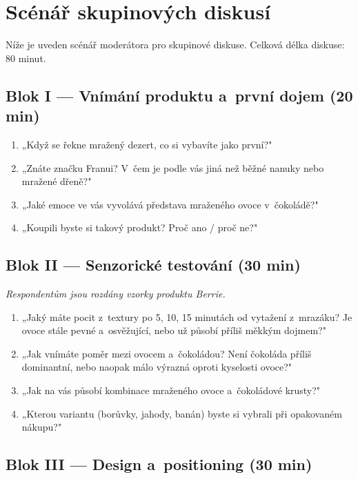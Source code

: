 \chapter{Scénář skupinových diskusí}
\label{app:fgd_scenario}

Níže je uveden scénář moderátora pro skupinové diskuse. Celková délka diskuse: 80 minut.

\section*{Blok I — Vnímání produktu a~první dojem (20 min)}

\begin{enumerate}
  \item „Když se řekne mražený dezert, co si vybavíte jako první?"
  \item „Znáte značku Franui? V~čem je podle vás jiná než běžné nanuky nebo mražené dřeně?"
  \item „Jaké emoce ve vás vyvolává představa mraženého ovoce v~čokoládě?"
  \item „Koupili byste si takový produkt? Proč ano / proč ne?"
\end{enumerate}

\section*{Blok II — Senzorické testování (30 min)}

\textit{Respondentům jsou rozdány vzorky produktu Berrie.}

\begin{enumerate}
  \item „Jaký máte pocit z~textury po 5, 10, 15 minutách od vytažení z~mrazáku? Je ovoce stále pevné a~osvěžující, nebo už působí příliš měkkým dojmem?"
  \item „Jak vnímáte poměr mezi ovocem a~čokoládou? Není čokoláda příliš dominantní, nebo naopak málo výrazná oproti kyselosti ovoce?"
  \item „Jak na vás působí kombinace mraženého ovoce a~čokoládové krusty?"
  \item „Kterou variantu (borůvky, jahody, banán) byste si vybrali při opakovaném nákupu?"
\end{enumerate}

\section*{Blok III — Design a~positioning (30 min)}

